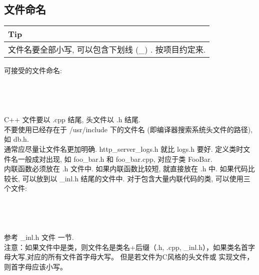 \documentclass[a4paper,11pt,CJK]{article}
\begin{document}
\begin{CJK}{UTF8}{gbsn}
\subsection{文件命名}
\begin{table}[htbp]
\flushleft
\begin{tabular}{p{400pt}}
\toprule
\rowcolor[gray]{.8} Tip \\
\midrule
文件名要全部小写, 可以包含下划线 (\_) . 按项目约定来.
\\
\bottomrule
\end{tabular}
\end{table}
\noindent
可接受的文件命名:\\
\\
\\
\\
\\
\indent C++ 文件要以 .cpp 结尾, 头文件以 .h 结尾.\\
\indent 不要使用已经存在于 /usr/include 下的文件名 (即编译器搜索系统头文件的路径), 如 db.h.\\
\indent 通常应尽量让文件名更加明确. http\_server\_logs.h 就比 logs.h 要好. 定义类时文件名一般成对出现, 如 foo\_bar.h 和 foo\_bar.cpp, 对应于类 FooBar.\\
\indent 内联函数必须放在 .h 文件中. 如果内联函数比较短, 就直接放在 .h 中. 如果代码比较长, 可以放到以 \_inl.h 结尾的文件中. 对于包含大量内联代码的类, 可以使用三个文件:\\
\\
\\
\\
\\
参考 \_inl.h 文件 一节.\\
\indent 注意：如果文件中是类，则文件名是类名+后缀（.h, .cpp, \_inl.h），如果类名首字母大写,对应的所有文件首字母大写。  但是若文件为C风格的头文件或 实现文件，则首字母应该小写。


\end{CJK}
\end{document}
